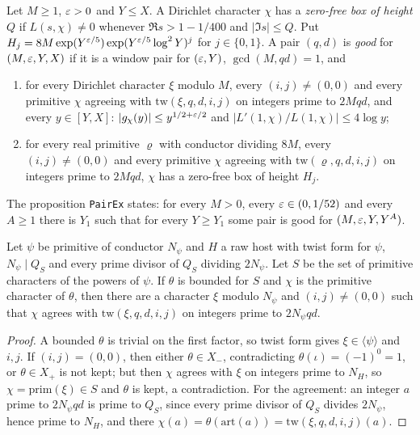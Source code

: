 \begin{definition}\label{host:pair-good}
Let $M\ge1$, $\varepsilon>0$ and $Y\le X$. A Dirichlet character $\chi$ has a
\emph{zero-free box of height $Q$} if $L(s,\chi)\ne0$ whenever
$\Re s>1-1/400$ and $|\Im s|\le Q$. Put
$H_j=8M\exp(Y^{\varepsilon/5})\exp(Y^{\varepsilon/5}\log^2Y)^j$ for $j\in\{0,1\}$. A
pair $(q,d)$ is \emph{good} for $(M,\varepsilon,Y,X)$ if it is a window pair for
$(\varepsilon,Y)$, $\gcd(M,qd)=1$, and
\begin{enumerate}
\item for every Dirichlet character $\xi$ modulo $M$, every $(i,j)\ne(0,0)$
  and every primitive $\chi$ agreeing with $\mathrm{tw}(\xi,q,d,i,j)$ on
  integers prime to $2Mqd$, and every $y\in[Y,X]$:
  $|g_{\chi}(y)|\le y^{1/2+\varepsilon/2}$ and $|L'(1,\chi)/L(1,\chi)|\le4\log y$;
\item for every real primitive $\varrho$ with conductor dividing $8M$,
  every $(i,j)\ne(0,0)$ and every primitive $\chi$ agreeing with
  $\mathrm{tw}(\varrho,q,d,i,j)$ on integers prime to $2Mqd$, $\chi$ has a
  zero-free box of height $H_j$.
\end{enumerate}
The proposition \texttt{PairEx} states: for every $M>0$, every
$\varepsilon\in(0,1/52)$ and every $A\ge1$ there is $Y_1$ such that for every
$Y\ge Y_1$ some pair is good for $(M,\varepsilon,Y,Y^A)$.
\end{definition}

\begin{lemma}\label{host:bounded-tw-key}
Let $\psi$ be primitive of conductor $N_{\psi}$ and $H$ a raw host with twist
form for $\psi$, $N_{\psi}\mid Q_S$ and every prime divisor of $Q_S$ dividing
$2N_{\psi}$. Let $S$ be the set of primitive characters of the powers of
$\psi$. If $\theta$ is bounded for $S$ and $\chi$ is the primitive
character of $\theta$, then there are a character $\xi$ modulo $N_{\psi}$ and
$(i,j)\ne(0,0)$ such that $\chi$ agrees with $\mathrm{tw}(\xi,q,d,i,j)$ on
integers prime to $2N_{\psi} qd$.
\end{lemma}
\begin{proof}
A bounded $\theta$ is trivial on the first factor, so twist form gives
$\xi\in\langle\psi\rangle$ and $i,j$. If $(i,j)=(0,0)$, then either
$\theta\in X_-$, contradicting $\theta(\iota)=(-1)^0=1$, or $\theta\in X_+$
is not kept; but then $\chi$ agrees with $\xi$ on integers prime to $N_H$,
so $\chi=\mathrm{prim}(\xi)\in S$ and $\theta$ is kept, a contradiction.
For the agreement: an integer $a$ prime to $2N_{\psi} qd$ is prime to $Q_S$,
since every prime divisor of $Q_S$ divides $2N_{\psi}$, hence prime to $N_H$,
and there $\chi(a)=\theta(\mathrm{art}(a))=\mathrm{tw}(\xi,q,d,i,j)(a)$.
\end{proof}

